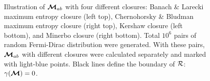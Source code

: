 \begin{figure}[h]
\begin{tabular}{cc}
  \end{tabular}
   \caption{Illustration of $\boldsymbol{\mathcal{M}}_{ab}$ with four different closures: Banach \& Larecki maximum entropy closure (left top), Chernohorsky \& Bludman maximum entropy closure (right top), Kershaw closure (left bottom), and Minerbo closure (right bottom).
   Total $10^{6}$ pairs of random Fermi-Dirac distribution were generated.
   With these pairs, $\boldsymbol{\mathcal{M}}_{ab}$ with different closures were calculated separately and marked with light-blue points.
   Black lines define the boundary of $\mathcal{R}$: $\gamma(\boldsymbol{\mathcal{M}}) = 0$.}
  \label{fig:MabWithDifferentClosure}
\end{figure}